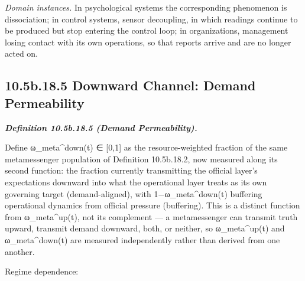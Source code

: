 \documentclass[
]{article}
\begin{document}
\emph{Domain instances.} In psychological systems the corresponding
phenomenon is dissociation; in control systems, sensor decoupling, in
which readings continue to be produced but stop entering the control
loop; in organizations, management losing contact with its own
operations, so that reports arrive and are no longer acted on.

\hypertarget{b.18.5-downward-channel-demand-permeability}{%
\subsection{10.5b.18.5 Downward Channel: Demand
Permeability}\label{b.18.5-downward-channel-demand-permeability}}

\emph{\textbf{Definition 10.5b.18.5 (Demand Permeability).}}

Define ω\_meta\^{}down(t) ∈ {[}0,1{]} as the resource-weighted fraction
of the same metamessenger population of Definition 10.5b.18.2, now
measured along its second function: the fraction currently transmitting
the official layer's expectations downward into what the operational
layer treats as its own governing target (demand-aligned), with
1−ω\_meta\^{}down(t) buffering operational dynamics from official
pressure (buffering). This is a distinct function from ω\_meta\^{}up(t),
not its complement --- a metamessenger can transmit truth upward,
transmit demand downward, both, or neither, so ω\_meta\^{}up(t) and
ω\_meta\^{}down(t) are measured independently rather than derived from
one another.

Regime dependence:
\end{document}
